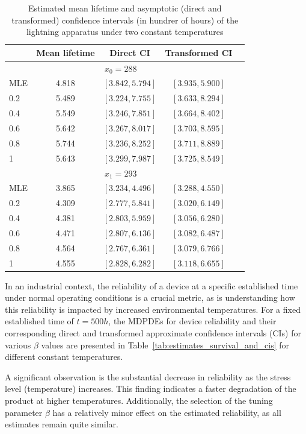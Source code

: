 \documentclass{article}
\begin{document}
\begin{table}[htb]
\centering
\caption{Estimated mean lifetime and asymptotic (direct and transformed) confidence intervals (in hundrer of hours) of the lightning apparatus under two  constant temperatures}
\label{tab:estimates_MTTF_and_cis}
\begin{tabular}{lcccc}
\toprule
& Mean lifetime & Direct CI & Transformed CI \\
\midrule
\multicolumn{4}{c}{$x_0 = 288$} \\
\midrule
MLE & 4.818 & $[3.842, 5.794]$ & $[3.935, 5.900]$ \\
0.2 & 5.489 & $[3.224, 7.755]$ & $[3.633, 8.294]$ \\
0.4 & 5.549 & $[3.246, 7.851]$ & $[3.664, 8.402]$ \\
0.6 & 5.642 & $[3.267, 8.017]$ & $[3.703, 8.595]$ \\
0.8 & 5.744 & $[3.236, 8.252]$ & $[3.711, 8.889]$ \\
1 & 5.643 & $[3.299, 7.987]$ & $[3.725, 8.549]$ \\
\midrule
\multicolumn{4}{c}{$x_1 = 293$} \\
\midrule
MLE & 3.865 & $[3.234, 4.496]$ & $[3.288, 4.550]$ \\
0.2 & 4.309 & $[2.777, 5.841]$ & $[3.020, 6.149]$ \\
0.4 & 4.381 & $[2.803, 5.959]$ & $[3.056, 6.280]$ \\
0.6 & 4.471 & $[2.807, 6.136]$ & $[3.082, 6.487]$ \\
0.8 & 4.564 & $[2.767, 6.361]$ & $[3.079, 6.766]$ \\
1 & 4.555 & $[2.828, 6.282]$ & $[3.118, 6.655]$ \\
\bottomrule
\end{tabular}
\end{table}

In an industrial context, the reliability of a device at a specific established time under normal operating conditions is a crucial metric, as is understanding how this reliability is impacted by increased environmental temperatures. For a fixed established time of $t=500h$, the MDPDEs for device reliability and their corresponding direct and transformed approximate confidence intervals (CIs) for various $\beta$ values are presented in Table~\ref{tab:estimates_survival_and_cis} for different constant temperatures.

A significant observation is the substantial decrease in reliability as the stress level (temperature) increases. This finding indicates a faster degradation of the product at higher temperatures. Additionally, the selection of the tuning parameter $\beta$ has a relatively minor effect on the estimated reliability, as all estimates remain quite similar.
\end{document}
